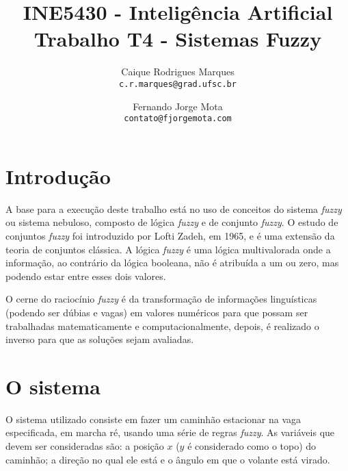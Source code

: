 \documentclass{article}
\title{\textbf{INE5430 - Inteligência Artificial \\
        \large Trabalho T4 - Sistemas Fuzzy}}
\author{
    Caique Rodrigues Marques \\
    {\texttt{c.r.marques@grad.ufsc.br}}
    \and
    Fernando Jorge Mota \\
    {\texttt{contato@fjorgemota.com}}
    \vspace{-5mm}
}
\date{}
\begin{document}
    \maketitle
    
    \section*{Introdução}
        A base para a execução deste trabalho está no uso de conceitos do
        sistema \textit{fuzzy} ou sistema nebuloso, composto de lógica
        \textit{fuzzy} e de conjunto \textit{fuzzy}. O estudo de conjuntos
        \textit{fuzzy} foi introduzido por Lofti Zadeh, em 1965, e é uma
        extensão da teoria de conjuntos clássica. A lógica \textit{fuzzy} é uma
        lógica multivalorada onde a informação, ao contrário da lógica
        booleana, não é atribuída a um ou zero, mas podendo estar entre esses
        dois valores.
        
        O cerne do raciocínio \textit{fuzzy} é da transformação de informações
        linguísticas (podendo ser dúbias e vagas) em valores numéricos para que
        possam ser trabalhadas matematicamente e computacionalmente, depois, é
        realizado o inverso para que as soluções sejam avaliadas.
    
    \section*{O sistema}
        O sistema utilizado consiste em fazer um caminhão estacionar na vaga
        especificada, em marcha ré, usando uma série de regras \textit{fuzzy}.
        As variáveis que devem ser consideradas são: a posição $x$ ($y$ é
        considerado como o topo) do caminhão; a direção no qual ele está e o
        ângulo em que o volante está virado.
        
\end{document}
